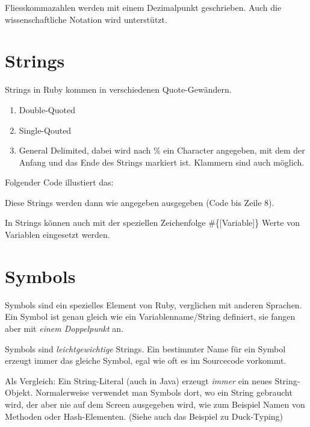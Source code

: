 \documentclass[a4book,11pt,twoside]{scrbook}
\begin{document}
Fliesskommazahlen werden mit einem Dezimalpunkt geschrieben. Auch die wissenschaftliche Notation wird unterstützt.








\section{Strings} %
\label{sec:strings}
Strings in Ruby kommen in verschiedenen Quote-Gewändern.
\begin{enumerate}
	\item Double-Quoted
	\item Single-Qouted
	\item General Delimited, dabei wird nach \% ein Character angegeben, mit dem der Anfang und das Ende des Strings markiert ist. Klammern sind auch möglich.
\end{enumerate}

Folgender Code illustiert das:


Diese Strings werden dann wie angegeben ausgegeben (Code bis Zeile 8).

In Strings können auch mit der speziellen Zeichenfolge \#\{[Variable]\} Werte von Variablen eingesetzt werden.





\section{Symbols} %
\label{sec:symbols}
Symbols sind ein spezielles Element von Ruby, verglichen mit anderen Sprachen. Ein Symbol ist genau gleich wie ein Variablenname/String definiert, sie fangen aber mit \emph{einem Doppelpunkt} an.

Symbols sind \emph{leichtgewichtige} Strings. Ein bestimmter Name für ein Symbol erzeugt immer das gleiche Symbol, egal wie oft es im Sourcecode vorkommt.

Als Vergleich: Ein String-Literal (auch in Java) erzeugt \emph{immer} ein neues String-Objekt. Normalerweise verwendet man Symbols dort, wo ein String gebraucht wird, der aber nie auf dem Screen ausgegeben wird, wie zum Beispiel Namen von Methoden oder Hash-Elementen. (Siehe auch das Beispiel zu Duck-Typing)


\end{document}
